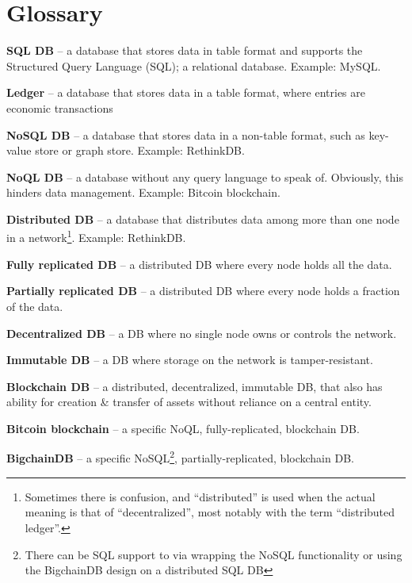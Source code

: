 \section{Glossary}\label{appendix:glossary}

\noindent\textbf{SQL DB} – a database that stores data in table format and supports the Structured Query Language (SQL); a relational database. Example: MySQL.

\medskip
\noindent\textbf{Ledger} – a database that stores data in a table format, where entries are economic transactions

\medskip
\noindent\textbf{NoSQL DB} – a database that stores data in a non-table format, such as key-value store or graph store. Example: RethinkDB.

\medskip
\noindent\textbf{NoQL DB} – a database without any query language to speak of. Obviously, this hinders data management. Example: Bitcoin blockchain.

\medskip
\noindent\textbf{Distributed DB} – a database that distributes data among more than one node in a network\footnote{Sometimes there is confusion, and “distributed” is used when the actual meaning is that of “decentralized”, most notably with the term “distributed ledger”.}. Example: RethinkDB.

\medskip
\noindent\textbf{Fully replicated DB} – a distributed DB where every node holds all the data.

\medskip
\noindent\textbf{Partially replicated DB} – a distributed DB where every node holds a fraction of the data.

\medskip
\noindent\textbf{Decentralized DB} – a DB where no single node owns or controls the network.

\medskip
\noindent\textbf{Immutable DB} – a DB where storage on the network is tamper-resistant.

\medskip
\noindent\textbf{Blockchain DB} – a distributed, decentralized, immutable DB, that also has ability for creation \& transfer of assets without reliance on a central entity.

\medskip
\noindent\textbf{Bitcoin blockchain} – a specific NoQL, fully-replicated, blockchain DB.

\medskip
\noindent\textbf{BigchainDB} – a specific NoSQL\footnote{There can be SQL support to via wrapping the NoSQL functionality or using the BigchainDB design on a distributed SQL DB}, partially-replicated, blockchain DB.